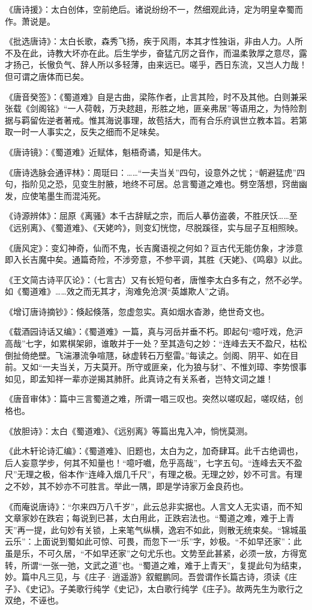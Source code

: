 \documentclass[letterpaper,10pt,english]{sphinxmanual}
\begin{document}
《唐诗援》：太白创体，空前绝后。诸说纷纷不一，然细观此诗，定为明皇幸蜀而作。萧说是。

《批选唐诗》：太白长歌，森秀飞扬，疾于风雨，本其才性独诣，非由人力。人所不及在此，诗教大坏亦在此。后生学步，奋猛亢厉之音作，而温柔敦厚之意尽，露才扬己，长慠负气、辞人所以多轻薄，由来远已。嗟乎，西日东流，又岂人力哉！但可谓之唐体而已矣。

《唐音癸签》：《蜀道难》自是古曲，梁陈作者，止言其险，时不及其他。白则兼采张载《剑阁铭》“一人荷戟，万夬趑趄，形胜之地，匪亲弗居”等语用之，为恃险割据与羁留佐逆者著戒。惟其海说事理，故苞括大，而有合乐府讽世立教本旨。若第取一时一人事实之，反失之细而不足味矣。

《唐诗镜》：《蜀道难》近赋体，魁梧奇谲，知是伟大。

《唐诗选脉会通评林》：周珽曰：……“一夫当关”四句，设意外之忧；“朝避猛虎”四句，指阶见之恐，见变生肘腋，地终不可居。总言蜀道之难也。劈空落想，窍凿幽发，应使笔墨生而混沌死。

《诗源辨体》：屈原《离骚》本千古辞赋之宗，而后人摹仿盗袭，不胜厌饫……至《远别离》、《蜀道难》、《天姥吟》，则变幻恍惚，尽脱蹊径，实与屈子互相照映。

《唐风定》：变幻神奇，仙而不鬼，长吉魔语视之何如？亘古代无能仿象，才涉意即入长吉魔中矣。通篇奇险，不涉旁意，不参平调，其胜《天姥》、《鸣皋》以此。

《王文简古诗平仄论》：（七言古）又有长短句者，唐惟李太白多有之，然不必学。如《蜀道难》……效之而无其才，洵难免沧溟“英雄欺人”之诮。

《增订唐诗摘钞》：倏起倏落，忽虚忽实。真如烟水杳渺，绝世奇文也。

《载酒园诗话又编》：《蜀道难》一篇，真与河岳并垂不朽。即起句“噫吁戏，危沪高哉”七字，如累棋架卵，谁敢并于一处？至其造句之妙：“连峰去天不盈尺，枯松倒扯倚绝壁。飞湍瀑流争喧豗，砅虚转石万壑雷。”每读之。剑阁、阴平、如在目前。又如“一夫当关，万夫莫开。所守或匪亲，化为狼与豺”、不惟刘璋、李势恨事如见，即孟知祥一辈亦逆揭其肺肝。此真诗之有关系者，岂特文词之雄！

《唐音审体》：篇中三言蜀道之难，所谓一唱三叹也。突然以嗟叹起，嗟叹结，创格也。

《放胆诗》：太白《蜀道难》、《远别离》等篇出鬼入冲，惝恍莫测。

《此木轩论诗汇编》：《蜀道难》、旧题也，太白为之，加奇肆耳。此千古绝调也，后人妄意学步，何其不知量也！“噫吁嚱，危乎高哉”，七字五句。“连峰去天不盈尺”无理之极，俗本作“连峰入烟几千尺”，有理之极。无理之妙，妙不可言。有理之不妙，其不妙亦不可胜言。举此一隅，即是学诗家万金良药也。

《而庵说唐诗》：“尔来四万八千岁”，此云总非实据也。人言文人无实语，而不知文章家妙在跌宕；每说到已甚，太白用此，正跌宕法也。“蜀道之难，难于上青天”再一提，此句妙有关锁，上来笔气纵横，逸宕不如此，则散无统束矣。“锦城虽云乐”：上面说到蜀如此可惊、可畏，而忽下一“乐”字，妙极。“不如早还家”：此虽是乐，不可久居，“不如早还家”之句尤乐也。文势至此甚紧，必须一放，方得宽转，所谓“一张一弛，文武之道”也。“蜀道之难，难于上青天”，复提此句为结束，妙。篇中凡三见，与《庄子·逍遥游》叙鲲鹏同。吾尝谓作长篇古诗，须读《庄子》、《史记》。子美歌行纯学《史记》，太白歌行纯学《庄子》。故两先生为歌行之双绝，不诬也。
\end{document}
